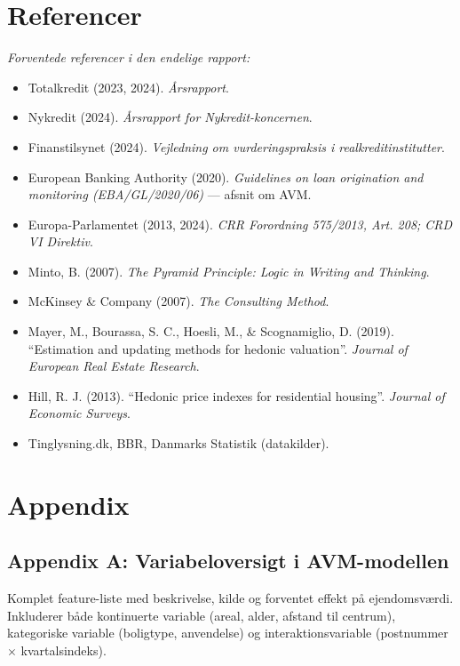 \documentclass[12pt]{article}
\begin{document}
\newpage

\section*{Referencer}
\printbibliography[heading=none]

\noindent\textit{Forventede referencer i den endelige rapport:}
\begin{itemize}[leftmargin=*, noitemsep]
    \item Totalkredit (2023, 2024). \textit{Årsrapport}.
    \item Nykredit (2024). \textit{Årsrapport for Nykredit-koncernen}.
    \item Finanstilsynet (2024). \textit{Vejledning om vurderingspraksis i realkreditinstitutter}.
    \item European Banking Authority (2020). \textit{Guidelines on loan origination and monitoring (EBA/GL/2020/06)} --- afsnit om AVM.
    \item Europa-Parlamentet (2013, 2024). \textit{CRR Forordning 575/2013, Art. 208; CRD VI Direktiv}.
    \item Minto, B. (2007). \textit{The Pyramid Principle: Logic in Writing and Thinking}.
    \item McKinsey \& Company (2007). \textit{The Consulting Method}.
    \item Mayer, M., Bourassa, S. C., Hoesli, M., \& Scognamiglio, D. (2019). ``Estimation and updating methods for hedonic valuation''. \textit{Journal of European Real Estate Research}.
    \item Hill, R. J. (2013). ``Hedonic price indexes for residential housing''. \textit{Journal of Economic Surveys}.
    \item Tinglysning.dk, BBR, Danmarks Statistik (datakilder).
\end{itemize}

\newpage

\section*{Appendix}

\subsection*{Appendix A: Variabeloversigt i AVM-modellen}
Komplet feature-liste med beskrivelse, kilde og forventet effekt på ejendomsværdi. Inkluderer både kontinuerte variable (areal, alder, afstand til centrum), kategoriske variable (boligtype, anvendelse) og interaktionsvariable (postnummer $\times$ kvartalsindeks).
\end{document}
